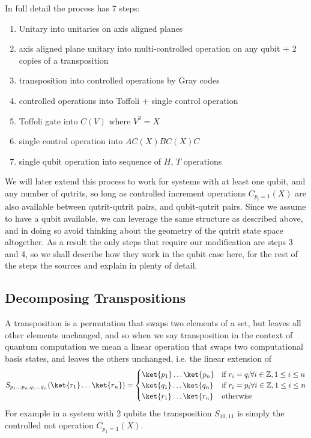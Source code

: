 In full detail the process has 7 steps:
\begin{enumerate}
	\item Unitary into unitaries on axis aligned planes
	\item axis aligned plane unitary into multi-controlled operation on any qubit + 2 copies of a transposition
	\item transposition into controlled operations by Gray codes
	\item controlled operations into Toffoli + single control operation
	\item Toffoli gate into $C(V)$ where $V^2 = X$
	\item single control operation into $AC(X)BC(X)C$
	\item single qubit operation into sequence of $H$, $T$ operations
\end{enumerate}
We will later extend this process to work for systems with at least one qubit, and any number of qutrits, so long as controlled increment operations $C_{p_i=1}(X)$ are also available between qutrit-qutrit pairs, and qubit-qutrit pairs. Since we assume to have a qubit available, we can leverage the same structure as described above, and in doing so avoid thinking about the geometry of the qutrit state space altogether. As a result the only steps that require our modification are steps 3 and 4, so we shall describe how they work in the qubit case here, for the rest of the steps the sources \cite{textbook} and \cite{universal-qubit} explain in plenty of detail.
\subsection{Decomposing Transpositions}
A transposition is a permutation that swaps two elements of a set, but leaves all other elements unchanged, and so when we say transposition in the context of quantum computation we mean a linear operation that swaps two computational basis states, and leaves the others unchanged, i.e. the linear extension of
\[S_{p_1\dots p_n, q_1\dots q_n}(\ket{r_1}\dots\ket{r_n}) = \begin{cases}
\ket{p_1}\dots\ket{p_n} & \text{if\ } r_i = q_i \forall i \in \mathbb{Z}, 1 \leq i \leq n \\
\ket{q_1}\dots\ket{q_n} & \text{if\ } r_i = p_i \forall i \in \mathbb{Z}, 1 \leq i \leq n \\
\ket{r_1}\dots\ket{r_n} & \text{otherwise}
\end{cases}
\]
For example in a system with 2 qubits the transposition $S_{10,11}$ is simply the controlled not operation $C_{p_1 = 1}(X)$.

